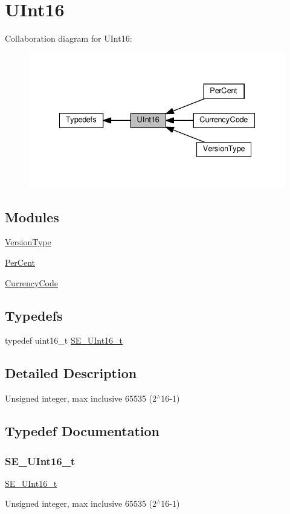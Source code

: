 \hypertarget{group__UInt16}{}\section{U\+Int16}
\label{group__UInt16}
Collaboration diagram for U\+Int16\+:\nopagebreak
\begin{figure}[H]
\begin{center}
\leavevmode
\includegraphics[width=335pt]{group__UInt16}
\end{center}
\end{figure}
\subsection*{Modules}
\begin{DoxyCompactItemize}
\item 
\hyperlink{group__VersionType}{Version\+Type}
\item 
\hyperlink{group__PerCent}{Per\+Cent}
\item 
\hyperlink{group__CurrencyCode}{Currency\+Code}
\end{DoxyCompactItemize}
\subsection*{Typedefs}
\begin{DoxyCompactItemize}
\item 
typedef uint16\+\_\+t \hyperlink{group__UInt16_gac68d541f189538bfd30cfaa712d20d29}{S\+E\+\_\+\+U\+Int16\+\_\+t}
\end{DoxyCompactItemize}


\subsection{Detailed Description}
Unsigned integer, max inclusive 65535 (2$^\wedge$16-\/1) 

\subsection{Typedef Documentation}
\mbox{\label{group__UInt16_gac68d541f189538bfd30cfaa712d20d29}} 
\subsubsection{\texorpdfstring{S\+E\+\_\+\+U\+Int16\+\_\+t}{SE\_UInt16\_t}}
{\footnotesize\ttfamily \hyperlink{group__UInt16_gac68d541f189538bfd30cfaa712d20d29}{S\+E\+\_\+\+U\+Int16\+\_\+t}}

Unsigned integer, max inclusive 65535 (2$^\wedge$16-\/1) 